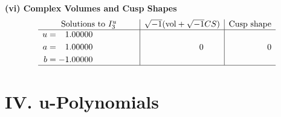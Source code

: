 \documentclass[1p]{elsarticle_modified}
\theoremstyle{definition}
\newcommand{\I}{\sqrt{-1}}
\begin{document}
\newpage\flushleft \textbf{(vi) Complex Volumes and Cusp Shapes}
$$\begin{array}{c|c|c}  
\text{Solutions to }I^u_{3}& \I (\text{vol} + \sqrt{-1}CS) & \text{Cusp shape}\\
 \hline 
\begin{aligned}
u &= \phantom{-}1.00000\phantom{ +0.000000I} \\
a &= \phantom{-}1.00000\phantom{ +0.000000I} \\
b &= -1.00000\phantom{ +0.000000I}\end{aligned}
 & \phantom{-0.000000 } 0 & \phantom{-0.000000 } 0\\
 \hline 
 \end{array}$$\newpage
\newpage\renewcommand{\arraystretch}{1}
\centering \section*{ IV. u-Polynomials}
\end{document}
